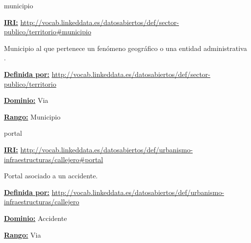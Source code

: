 \begin{mybox}{municipio}
\begin{flushleft}
\underline{\textbf{IRI:}}
\url{http://vocab.linkeddata.es/datosabiertos/def/sector-publico/territorio#municipio}
\newline

Municipio al que pertenece un fenómeno geográfico o una entidad administrativa  \cite{datoabiertos_municipio}.
\newline

\underline{\textbf{Definida por:}}\newline
\url{http://vocab.linkeddata.es/datosabiertos/def/sector-publico/territorio}
\newline

\underline{\textbf{Dominio:}}		Via
\newline

\underline{\textbf{Rango:}}		Municipio

\end{flushleft}
\end{mybox}









\begin{mybox}{portal}
\begin{flushleft}
\underline{\textbf{IRI:}}
\url{http://vocab.linkeddata.es/datosabiertos/def/urbanismo-infraestructuras/callejero#portal}
\newline

Portal asociado a un accidente.
\newline

\underline{\textbf{Definida por:}}\newline
\url{http://vocab.linkeddata.es/datosabiertos/def/urbanismo-infraestructuras/callejero}
\newline

\underline{\textbf{Dominio:}}		Accidente
\newline

\underline{\textbf{Rango:}}		Via

\end{flushleft}
\end{mybox}


































